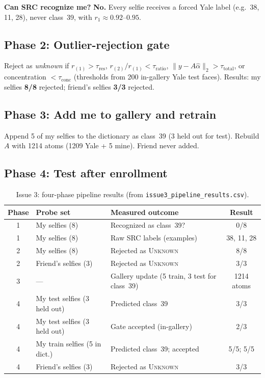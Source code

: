 \documentclass[11pt,a4paper]{article}
\begin{document}
\textbf{Can SRC recognize me?} \textbf{No.} Every selfie receives a forced Yale label (e.g.\ 38, 11, 28), never class~39, with $r_1\approx 0.92$--$0.95$.

\subsection{Phase 2: Outlier-rejection gate}

Reject as \emph{unknown} if $r_{(1)}>\tau_{\mathrm{res}}$, $r_{(2)}/r_{(1)}<\tau_{\mathrm{ratio}}$, $\|y-A\hat\alpha\|_2>\tau_{\mathrm{total}}$, or concentration $<\tau_{\mathrm{conc}}$ (thresholds from 200 in-gallery Yale test faces). Results: my selfies \textbf{8/8} rejected; friend's selfies \textbf{3/3} rejected.

\subsection{Phase 3: Add me to gallery and retrain}

Append 5 of my selfies to the dictionary as class~39 (3 held out for test). Rebuild $A$ with 1214 atoms (1209 Yale + 5 mine). Friend never added.

\subsection{Phase 4: Test after enrollment}

\begin{table}[htbp]
  \centering
  \caption{Issue 3: four-phase pipeline results (from \texttt{issue3\_pipeline\_results.csv}).}
  \label{tab:issue3}
  \small
  \begin{tabular}{clp{6.2cm}c}
    \toprule
    Phase & Probe set & Measured outcome & Result \\
    \midrule
    1 & My selfies (8) & Recognized as class~39? & 0/8 \\
    1 & My selfies (8) & Raw SRC labels (examples) & 38, 11, 28 \\
    2 & My selfies (8) & Rejected as \textsc{Unknown} & 8/8 \\
    2 & Friend's selfies (3) & Rejected as \textsc{Unknown} & 3/3 \\
    3 & --- & Gallery update (5 train, 3 test for class~39) & 1214 atoms \\
    4 & My test selfies (3 held out) & Predicted class~39 & 3/3 \\
    4 & My test selfies (3 held out) & Gate accepted (in-gallery) & 2/3 \\
    4 & My train selfies (5 in dict.) & Predicted class~39; accepted & 5/5; 5/5 \\
    4 & Friend's selfies (3) & Rejected as \textsc{Unknown} & 3/3 \\
    \bottomrule
  \end{tabular}
\end{table}
\end{document}
